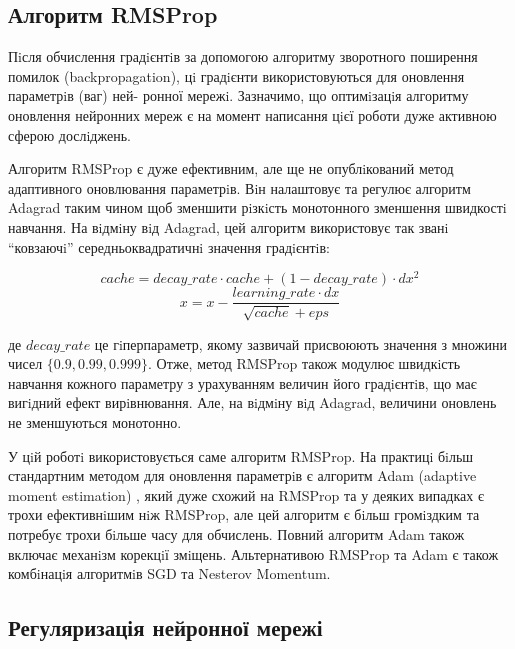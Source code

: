 \subsection{Алгоритм RMSProp}

Пiсля обчислення градiєнтiв за допомогою алгоритму зворотного поширення помилок (backpropagation), цi градiєнти використовуються для оновлення параметрiв (ваг) ней- ронної мережi. Зазначимо, що оптимiзацiя алгоритму оновлення нейронних мереж є на момент написання цiєї роботи дуже активною сферою дослiджень.

Алгоритм RMSProp \citep{nn:rmsprop} є дуже ефективним, але ще не опублiкований метод адаптивного оновлювання параметрiв. Вiн налаштовує та регулює алгоритм Adagrad \parencite{nn:adagrad} таким чином щоб зменшити рiзкiсть монотонного зменшення швидкостi навчання. На вiдмiну вiд Adagrad, цей алгоритм використовує так званi \enquote{ковзаючi} середньоквадратичнi значення градiєнтiв:

\begin{equation*}
cache = decay\_rate \cdot cache + (1 - decay\_rate) \cdot dx^2
\end{equation*}
\begin{equation*}
x = x - \frac{learning\_rate \cdot dx}{\sqrt{cache} + eps}
\end{equation*}

де \(decay\_rate\) це гiперпараметр, якому зазвичай присвоюють значення з множини чисел \(\{0.9, 0.99, 0.999\}\). Отже, метод RMSProp також модулює швидкiсть навчання кожного параметру з урахуванням величин його градiєнтiв, що має вигiдний ефект вирiвнювання. Але, на вiдмiну вiд Adagrad, величини оновлень не зменшуються монотонно.

У цiй роботi використовується саме алгоритм RMSProp. На практицi бiльш стандартним методом для оновлення параметрiв є алгоритм Adam (adaptive moment estimation) \parencite{nn:adam}, який дуже схожий на RMSProp та у деяких випадках є трохи ефективнiшим нiж RMSProp, але цей алгоритм є бiльш громiздким та потребує трохи бiльше часу для обчислень. Повний алгоритм Adam також включає механiзм корекцiї змiщень. Альтернативою RMSProp та Adam є також комбiнацiя алгоритмiв SGD та Nesterov Momentum.

\subsection{Регуляризація нейронної мережі}

